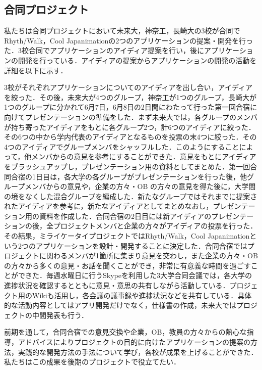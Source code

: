 \subsection{合同プロジェクト}

\par 私たちは合同プロジェクトにおいて未来大，神奈工，長崎大の3校が合同でRhyth/Walk，Cool Japanimationの2つのアプリケーションの提案・開発を行った．3校合同でアプリケーションのアイディア提案を行い，後にアプリケーションの開発を行っている．アイディアの提案からアプリケーションの開発の活動を詳細を以下に示す．
\par 3校がそれぞれアプリケーションについてのアイディアを出し合い，アイディアを絞った．その後，未来大が4つのグループ，神奈工が1つのグループ，長崎大が1つのグループに分かれて6月7日，6月8日の2日間にわたって行った第一回合宿に向けてプレゼンテーションの準備をした．まず未来大では，各グループのメンバが持ち寄ったアイディアをもとに各グループ2つ，計6つのアイディアに絞った．その6つの中から学内代表のアイディアとなるものを投票の末4つに絞った．その4つのアイディアでグループメンバをシャッフルした．このようにすることによって，他メンバからの意見を参考にすることができた．意見をもとにアイディアをブラッシュアップし，プレゼンテーション用の資料としてまとめた．第一回合同合宿の1日目は，各大学の各グループがプレゼンテーションを行った後，他グループメンバからの意見や，企業の方々・OB の方々の意見を得た後に，大学間の境をなくした混合グループを編成した．新たなグループではそれまでに提案されたアイディアを参考に，新たなアイディアとしてまとめなおし，プレゼンテーション用の資料を作成した．合同合宿の2日目には新アイディアのプレゼンテーションの後，全プロジェクトメンバと企業の方々がアイディアの投票を行った．その結果，ミライケータイプロジェクトではRhyth/Walk，Cool Japanimationという2つのアプリケーションを設計・開発することに決定した．合同合宿ではプロジェクトに関わるメンバが1箇所に集まり意見を交わし，また企業の方々・OBの方々から多くの意見・お話を聞くことができ，非常に有意義な時間を過ごすことができた．毎週水曜日に行うSkypeを利用した3大学合同会議では，各大学の進捗状況を確認するとともに意見・意思の共有しながら活動している．プロジェクト用のWikiも活用し，各会議の議事録や進捗状況などを共有している．具体的な活動内容としてはアプリ開発だけでなく，仕様書の作成，未来大ではプロジェクトの中間発表も行う．
\par 前期を通して，合同合宿での意見交換や企業，OB，教員の方々からの熱心な指導，アドバイスによりプロジェクトの目的に向けたアプリケーションの提案の方法，実践的な開発方法の手法について学び，各校が成果を上げることができた．私たちはこの成果を後期のプロジェクトで役立てたい．

